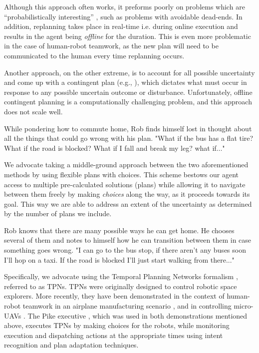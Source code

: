 Although this approach often works, it preforms poorly on  problems which are ``probabilistically interesting'' \cite{little2007probabilistic}, such as problems with avoidable dead-ends. In addition, replanning takes place in real-time i.e. during online execution and results in the agent being \emph{offline} for the duration. This is even more problematic in the case of human-robot teamwork, as the new plan will need to be communicated to the human every time replanning occurs.

Another approach, on the other extreme, is to account for all possible uncertainty and come up with a contingent plan (e.g.,  \cite{hoffmann2005contingent}), which dictates what must occur in response to any possible uncertain outcome or disturbance.   
Unfortunately, offline contingent planning is a computationally challenging problem, and this approach does not scale well.

\begin{tcolorbox}[colback=red!5!white,colframe=red!75!black]
  While pondering how to commute home, Rob finds himself lost in thought about all the things that could go wrong with his plan. "What if the bus has a flat tire? What if the road is blocked? What if I fall and break my leg? what if..."  
\end{tcolorbox}

We advocate taking a middle-ground approach between 
the two aforementioned methods by using flexible plans with choices. This scheme bestows our agent access to multiple pre-calculated solutions (plans) while allowing it to navigate between them freely by making \emph{choices} along the way, as it proceeds towards its goal.
This way we are able to address an extent of the uncertainty as determined by the number of plans we include. 

\begin{tcolorbox}[colback=red!5!white,colframe=red!75!black]
  Rob knows that there are many possible ways he can get home. He chooses several of them and notes to himself how he can transition between them in case something goes wrong. "I can go to the bus stop, if there aren't any buses soon I'll hop on a taxi. If the road is blocked I'll just start walking from there..."
\end{tcolorbox}


Specifically, we advocate using the Temporal Planning Networks formalism \cite{kim2001executing}, referred to as TPNs. TPNs were originally designed to control robotic space explorers. More recently, they have been demonstrated in the context of human-robot teamwork in an airplane manufacturing scenario \cite{Burke2014}, and in controlling micro-UAVs \cite{Timmons2015}.
%
The Pike executive \cite{levine2018watching}, which was used in both demonstrations mentioned above, executes TPNs by making choices for the robots, while monitoring execution and dispatching actions at the appropriate times using intent recognition and plan adaptation techniques.

